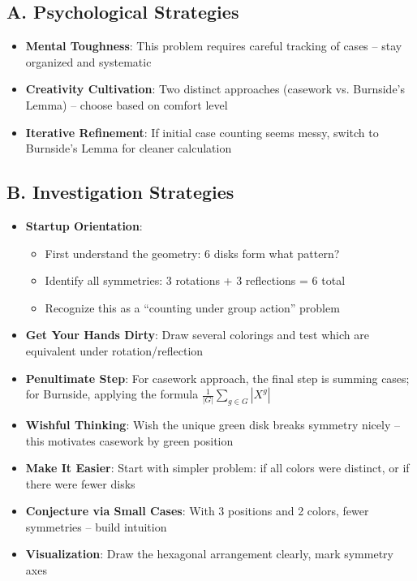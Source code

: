 \documentclass[11pt]{article}
\begin{document}
\begin{strategicbox}
\subsection*{A. Psychological Strategies}
\begin{itemize}[leftmargin=*]
    \item \textbf{Mental Toughness}: This problem requires careful tracking of cases -- stay organized and systematic
    \item \textbf{Creativity Cultivation}: Two distinct approaches (casework vs. Burnside's Lemma) -- choose based on comfort level
    \item \textbf{Iterative Refinement}: If initial case counting seems messy, switch to Burnside's Lemma for cleaner calculation
\end{itemize}

\subsection*{B. Investigation Strategies}
\begin{itemize}[leftmargin=*]
    \item \textbf{Startup Orientation}: 
    \begin{itemize}
        \item First understand the geometry: 6 disks form what pattern?
        \item Identify all symmetries: 3 rotations + 3 reflections = 6 total
        \item Recognize this as a ``counting under group action'' problem
    \end{itemize}
    \item \textbf{Get Your Hands Dirty}: Draw several colorings and test which are equivalent under rotation/reflection
    \item \textbf{Penultimate Step}: For casework approach, the final step is summing cases; for Burnside, applying the formula $\frac{1}{|G|}\sum_{g \in G} |X^g|$
    \item \textbf{Wishful Thinking}: Wish the unique green disk breaks symmetry nicely -- this motivates casework by green position
    \item \textbf{Make It Easier}: Start with simpler problem: if all colors were distinct, or if there were fewer disks
    \item \textbf{Conjecture via Small Cases}: With 3 positions and 2 colors, fewer symmetries -- build intuition
    \item \textbf{Visualization}: Draw the hexagonal arrangement clearly, mark symmetry axes
\end{itemize}


\end{strategicbox}
\end{document}
